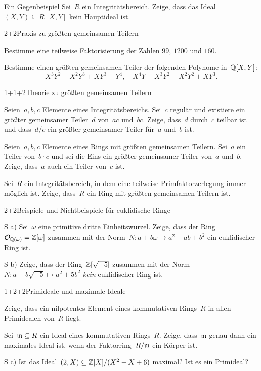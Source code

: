 \documentclass{algblatt}
\begin{document}

\begin{aufgabe}{3}{Ein Gegenbeispiel}
Sei~$R$ ein Integritätsbereich. Zeige, dass das Ideal~$(X,Y) \subseteq R[X,Y]$
kein Hauptideal ist.
\end{aufgabe}

\begin{aufgabeE}{2+2}{Praxis zu größten gemeinsamen Teilern}
\item Bestimme eine teilweise Faktorisierung der Zahlen $99$, $1200$ und $160$.
\item Bestimme einen größten gemeinsamen Teiler der folgenden Polynome
in~$\mathbb{Q}[X,Y]$:
\[ X^3Y^2 - X^2Y^3 + XY^3 - Y^4, \quad X^4Y - X^3Y^2 - X^2Y^2 + XY^3. \]
\end{aufgabeE}
\vspace{-1em}

\begin{aufgabeE}{1+1+2}{Theorie zu größten gemeinsamen Teilern}
\item Seien~$a,b,c$ Elemente eines Integritätsbereichs. Sei~$c$ regulär und
existiere ein größter gemeinsamer Teiler~$d$ von~$ac$ und~$bc$. Zeige, dass~$d$
durch~$c$ teilbar ist und dass~$d/c$ ein größter gemeinsamer Teiler für~$a$
und~$b$ ist.
\item Seien~$a,b,c$ Elemente eines Rings mit größten gemeinsamen Teilern.
Sei~$a$ ein Teiler von~$b \cdot c$ und sei die Eins ein größter gemeinsamer
Teiler von~$a$ und~$b$. Zeige, dass~$a$ auch ein Teiler von~$c$ ist.
\item Sei~$R$ ein Integritätsbereich, in dem eine teilweise Primfaktorzerlegung
immer möglich ist. Zeige, dass~$R$ ein Ring mit größten gemeinsamen Teilern
ist.
\end{aufgabeE}

\begin{aufgabeE}{2+2}{Beispiele und Nichtbeispiele für euklidische Ringe}
\item[S a)] Sei~$\omega$ eine primitive dritte Einheitswurzel. Zeige, dass der
Ring~$\mathcal{O}_{\mathbb{Q}(\omega)} = \mathbb{Z}[\omega]$ zusammen mit der Norm~$N : a+b\omega
\mapsto a^2 - ab + b^2$ ein euklidischer Ring ist.
\item[S b)] Zeige, dass der Ring~$\mathbb{Z}[\sqrt{-5}]$ zusammen mit der Norm~$N :
a+b\sqrt{-5} \mapsto a^2 + 5b^2$ \emph{kein} euklidischer Ring ist.
\end{aufgabeE}

\begin{aufgabeE}{1+2+2}{Primideale und maximale Ideale}
\item Zeige, dass ein nilpotentes Element eines kommutativen Rings~$R$ in allen
Primidealen von~$R$ liegt.
\item Sei~$\mathfrak{m} \subseteq R$ ein Ideal eines kommutativen Rings~$R$. Zeige,
dass~$\mathfrak{m}$ genau dann ein maximales Ideal ist, wenn der Faktorring~$R/\mathfrak{m}$ ein
Körper ist.
\item[S c)] Ist das Ideal~$(2, X) \subseteq \mathbb{Z}[X]/(X^2-X+6)$ maximal? Ist es ein
Primideal?
\end{aufgabeE}
\end{document}
